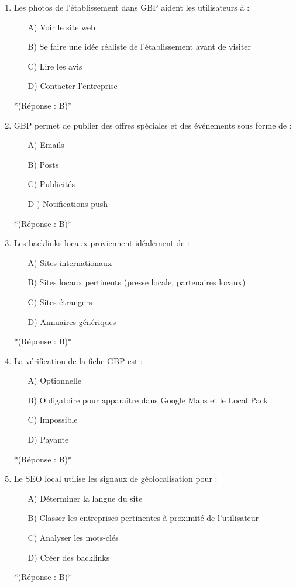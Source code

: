 \documentclass[12pt,a4paper,twoside]{report}
\begin{document}
\begin{enumerate}
\item Les photos de l'établissement dans GBP aident les utilisateurs à :
\begin{itemize}
\item[A)] Voir le site web
\item[B)] Se faire une idée réaliste de l'établissement avant de visiter
\item[C)] Lire les avis
\item[D)] Contacter l'entreprise
\end{itemize}
*(Réponse : B)*

\item GBP permet de publier des offres spéciales et des événements sous forme de :
\begin{itemize}
\item[A)] Emails
\item[B)] Posts
\item[C)] Publicités
\item[D]) Notifications push
\end{itemize}
*(Réponse : B)*

\item Les backlinks locaux proviennent idéalement de :
\begin{itemize}
\item[A)] Sites internationaux
\item[B)] Sites locaux pertinents (presse locale, partenaires locaux)
\item[C)] Sites étrangers
\item[D)] Annuaires génériques
\end{itemize}
*(Réponse : B)*

\item La vérification de la fiche GBP est :
\begin{itemize}
\item[A)] Optionnelle
\item[B)] Obligatoire pour apparaître dans Google Maps et le Local Pack
\item[C)] Impossible
\item[D)] Payante
\end{itemize}
*(Réponse : B)*

\item Le SEO local utilise les signaux de géolocalisation pour :
\begin{itemize}
\item[A)] Déterminer la langue du site
\item[B)] Classer les entreprises pertinentes à proximité de l'utilisateur
\item[C)] Analyser les mots-clés
\item[D)] Créer des backlinks
\end{itemize}
*(Réponse : B)*


\end{enumerate}
\end{document}
